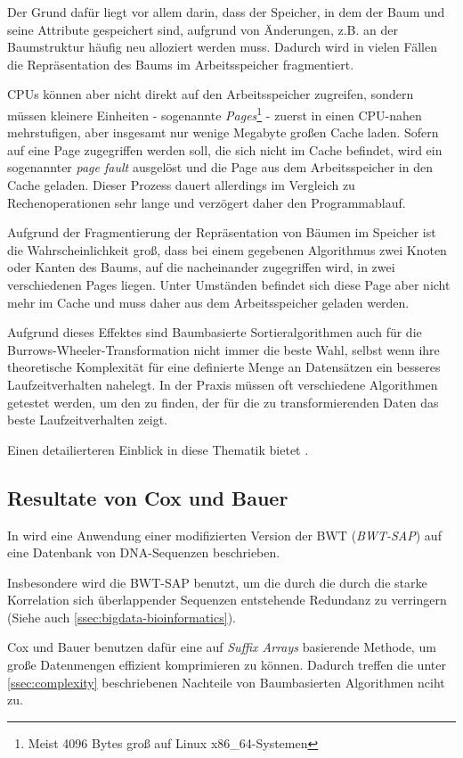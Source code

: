 \documentclass[ngerman,pdftex,paper=A4,DIV=calc,titlepage,12pt]{scrartcl}
\newtheorem[L]{boxedDefinition}{Definition}
\begin{document}
Der Grund dafür liegt vor allem darin, dass der Speicher, in dem der Baum und seine Attribute gespeichert sind, aufgrund von Änderungen, z.B. an der Baumstruktur häufig neu alloziert werden muss. Dadurch wird in vielen Fällen die Repräsentation des Baums im Arbeitsspeicher fragmentiert.

CPUs können aber nicht direkt auf den Arbeitsspeicher zugreifen, sondern müssen kleinere Einheiten - sogenannte \textit{Pages}\footnote{Meist 4096 Bytes groß auf Linux x86\_64-Systemen} - zuerst in einen CPU-nahen mehrstufigen, aber insgesamt nur wenige Megabyte großen Cache laden. Sofern auf eine Page zugegriffen werden soll, die sich nicht im Cache befindet, wird ein sogenannter \textit{page fault} ausgelöst und die Page aus dem Arbeitsspeicher in den Cache geladen. Dieser Prozess dauert allerdings im Vergleich zu Rechenoperationen sehr lange und verzögert daher den Programmablauf.

Aufgrund der Fragmentierung der Repräsentation von Bäumen im Speicher ist die Wahrscheinlichkeit groß, dass bei einem gegebenen Algorithmus zwei Knoten oder Kanten des Baums, auf die nacheinander zugegriffen wird, in zwei verschiedenen Pages liegen. Unter Umständen befindet sich diese Page aber nicht mehr im Cache und muss daher aus dem Arbeitsspeicher geladen werden. 

Aufgrund dieses Effektes sind Baumbasierte Sortieralgorithmen auch für die Burrows-Wheeler-Transformation nicht immer die beste Wahl, selbst wenn ihre theoretische Komplexität für eine definierte Menge an Datensätzen ein besseres Laufzeitverhalten nahelegt. In der Praxis müssen oft verschiedene Algorithmen getestet werden, um den zu finden, der für die zu transformierenden Daten das beste Laufzeitverhalten zeigt.

Einen detailierteren Einblick in diese Thematik bietet \cite{Drepper2007}.
\subsection{Resultate von Cox und Bauer}
In \cite{cox2012large} wird eine Anwendung einer modifizierten Version der BWT (\textit{\glqq BWT-SAP\grqq}) auf eine Datenbank von DNA-Sequenzen beschrieben.

Insbesondere wird die BWT-SAP benutzt, um die durch die durch die starke Korrelation sich überlappender Sequenzen entstehende Redundanz zu verringern (Siehe auch \vref{ssec:bigdata-bioinformatics}).

Cox und Bauer benutzen dafür eine auf \textit{Suffix Arrays} basierende Methode, um große Datenmengen effizient komprimieren zu können. Dadurch treffen die unter \vref{ssec:complexity} beschriebenen Nachteile von Baumbasierten Algorithmen nciht zu.
\end{document}
